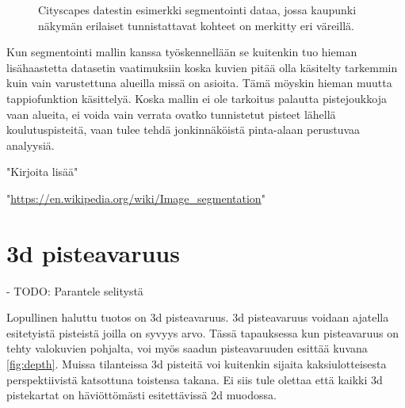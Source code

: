 \begin{figure}[h]
\centering
{}
\caption[Tämä on lyhyt kuvateksti.]{Cityscapes datestin esimerkki segmentointi dataa, jossa kaupunki näkymän erilaiset tunnistattavat kohteet on merkitty eri väreillä.}
\label{fig:labels}
\end{figure}

Kun segmentointi mallin kanssa työskennellään se kuitenkin tuo hieman lisähaastetta datasetin vaatimuksiin koska kuvien pitää olla käsitelty tarkemmin kuin vain varustettuna alueilla missä on asioita. Tämä möyskin hieman muutta tappiofunktion käsittelyä. Koska mallin ei ole tarkoitus palautta pistejoukkoja vaan alueita, ei voida vain verrata ovatko tunnistetut pisteet lähellä koulutuspisteitä, vaan tulee tehdä jonkinnäköistä pinta-alaan perustuvaa analyysiä. 

"Kirjoita lisää"

"\url{https://en.wikipedia.org/wiki/Image_segmentation}"

\section{3d pisteavaruus}

- TODO: Parantele selitystä

Lopullinen haluttu tuotos on 3d  pisteavaruus. 3d pisteavaruus voidaan ajatella esitetyistä pisteistä joilla on syvyys arvo. Tässä tapauksessa kun pisteavaruus on tehty valokuvien pohjalta, voi myös saadun pisteavaruuden esittää kuvana \ref{fig:depth}. Muissa tilanteissa 3d pisteitä voi kuitenkin sijaita kaksiulotteisesta perspektiivistä katsottuna toistensa takana. Ei siis tule olettaa että kaikki 3d pistekartat on häviöttömästi esitettävissä 2d muodossa. 


